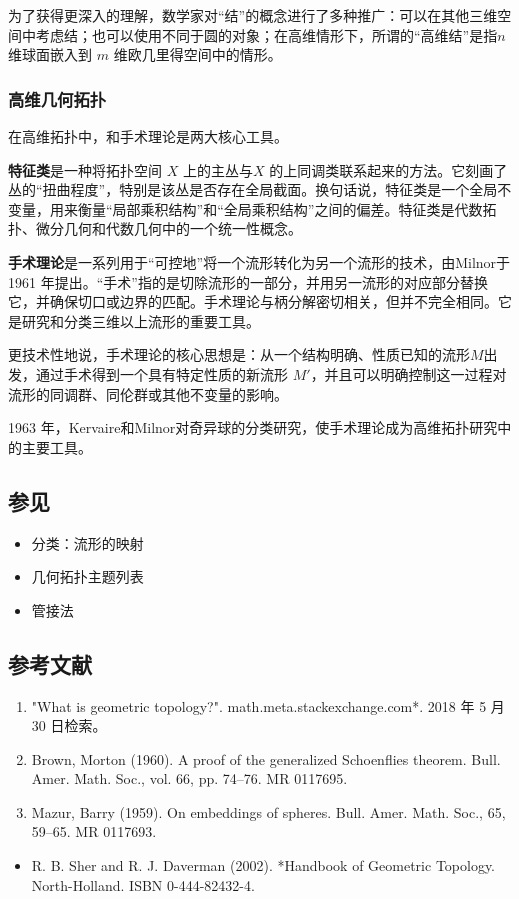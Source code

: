 为了获得更深入的理解，数学家对“结”的概念进行了多种推广：可以在其他三维空间中考虑结；也可以使用不同于圆的对象；在高维情形下，所谓的“高维结”是指$n$ 维球面嵌入到 $m$ 维欧几里得空间中的情形。
\subsubsection{高维几何拓扑}
在高维拓扑中，和手术理论是两大核心工具。

\textbf{特征类}是一种将拓扑空间 $X$ 上的主丛与$X$ 的上同调类联系起来的方法。它刻画了丛的“扭曲程度”，特别是该丛是否存在全局截面。换句话说，特征类是一个全局不变量，用来衡量“局部乘积结构”和“全局乘积结构”之间的偏差。特征类是代数拓扑、微分几何和代数几何中的一个统一性概念。

\textbf{ 手术理论}是一系列用于“可控地”将一个流形转化为另一个流形的技术，由Milnor于 1961 年提出。“手术”指的是切除流形的一部分，并用另一流形的对应部分替换它，并确保切口或边界的匹配。手术理论与柄分解密切相关，但并不完全相同。它是研究和分类三维以上流形的重要工具。

更技术性地说，手术理论的核心思想是：从一个结构明确、性质已知的流形$M$出发，通过手术得到一个具有特定性质的新流形 $M'$，并且可以明确控制这一过程对流形的同调群、同伦群或其他不变量的影响。

1963 年，Kervaire和Milnor对奇异球的分类研究，使手术理论成为高维拓扑研究中的主要工具。
\subsection{参见}
\begin{itemize}
\item 分类：流形的映射
\item 几何拓扑主题列表
\item 管接法
\end{itemize}
\subsection{参考文献}
\begin{enumerate}
\item "What is geometric topology?". math.meta.stackexchange.com*. 2018 年 5 月 30 日检索。
\item Brown, Morton (1960). A proof of the generalized Schoenflies theorem. Bull. Amer. Math. Soc., vol. 66, pp. 74–76. MR 0117695.
\item Mazur, Barry (1959). On embeddings of spheres. Bull. Amer. Math. Soc., 65, 59–65. MR 0117693.
\end{enumerate}
\begin{itemize}
\item R. B. Sher and R. J. Daverman (2002). *Handbook of Geometric Topology. North-Holland. ISBN 0-444-82432-4.
\end{itemize}